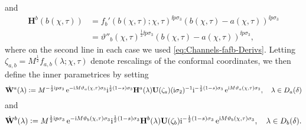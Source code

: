 and
\begin{equation}
\begin{split}
\mathbf{H}^b(b(\chi,\tau))&=f_b'(b(\chi,\tau);\chi,\tau)^{\ii p\sigma_3}(b(\chi,\tau)-a(\chi,\tau))^{\ii p\sigma_3}\\
&=\vartheta''_b(\chi,\tau)^{\frac{1}{2}\ii p\sigma_3}(b(\chi,\tau)-a(\chi,\tau))^{\ii p\sigma_3},
\end{split}
\label{eq:Channels-Hb-center}
\end{equation}
where on the second line in each case we used \eqref{eq:Channels-fafb-Derivs}.
Letting 
$\zeta_{a,b}=M^{\frac{1}{2}}f_{a,b}(\lambda;\chi,\tau)$
denote rescalings of the conformal coordinates, 
we then define the inner parametrices by setting
\begin{equation}
\dot{\mathbf{W}}^a(\lambda)\vcentcolon= M^{-\frac{1}{2}\mathrm{i} p\sigma_3}\,\mathrm{e}^{-\mathrm{i} M\vartheta_a(\chi,\tau)\sigma_3}\mathrm{i}^{\frac{1}{2}(1-s)\sigma_3}\mathbf{H}^a(\lambda)
\mathbf{U}(\zeta_a)(\mathrm{i}\sigma_2)^{-1}\mathrm{i}^{-\frac{1}{2}(1-s)\sigma_3}\,\mathrm{e}^{\mathrm{i} M\vartheta_a(\chi,\tau)\sigma_3},\quad\lambda\in D_a(\delta)
\label{eq:Channels-Ta-ALT}
\end{equation}
and
\begin{equation}
\dot{\mathbf{W}}^b(\lambda)\vcentcolon= M^{\frac{1}{2}\mathrm{i} p\sigma_3}\,\mathrm{e}^{-\mathrm{i} M\vartheta_b(\chi,\tau)\sigma_3}\mathrm{i}^{\frac{1}{2}(1-s)\sigma_3}\mathbf{H}^b(\lambda)
\mathbf{U}(\zeta_b)\mathrm{i}^{-\frac{1}{2}(1-s)\sigma_3}\,\mathrm{e}^{\mathrm{i} M\vartheta_b(\chi,\tau)\sigma_3},\quad\lambda\in D_b(\delta).
\label{eq:Channels-Tb-ALT}
\end{equation}
